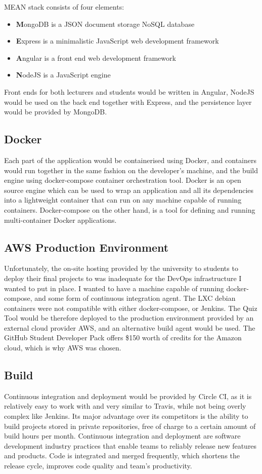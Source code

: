 MEAN stack consists of four elements:
\begin{itemize}
  \item \textbf{M}ongoDB is a JSON document storage NoSQL database
  \item \textbf{E}xpress is a minimalistic JavaScript web development framework
  \item \textbf{A}ngular is a front end web development framework
  \item \textbf{N}odeJS is a JavaScript engine
\end{itemize}

Front ends for both lecturers and students would be written in Angular, NodeJS would be
used on the back end together with Express, and the persistence layer would be provided
by MongoDB.

\subsection{Docker}
Each part of the application would be containerised using Docker\cite{19}, and containers
would run together in the same fashion on the developer's machine, and the build engine
using docker-compose\cite{20} container orchestration tool. Docker is an open source
engine which can be used to wrap an application and all its dependencies into a
lightweight container that can run on any machine capable of running containers\cite{21}.
Docker-compose on the other hand, is a tool for defining and running multi-container
Docker applications.

\subsection{AWS Production Environment}
Unfortunately, the on-site hosting provided by the university to students to deploy
their final projects to was inadequate for the DevOps infrastructure I wanted to
put in place. I wanted to have a machine capable of running docker-compose, and some
form of continuous integration agent. The LXC debian containers\cite{22} were not
compatible with either docker-compose, or Jenkins\cite{23}. The Quiz Tool would be therefore
deployed to the production environment provided by an external cloud provider AWS\cite{24},
and an alternative build agent would be used. The GitHub Student Developer Pack\cite{25} offers
\$150 worth of credits for the Amazon cloud, which is why AWS was chosen.

\subsection{Build}
Continuous integration and deployment would be provided by Circle CI\cite{26}, as it is relatively easy
to work with and very similar to Travis\cite{27}, while not being overly complex like Jenkins\cite{23}.
Its major advantage over its competitors is the ability to build projects stored in private
repositories, free of charge to a certain amount of build hours per month. Continuous integration
and deployment are software development industry practices that enable teams to reliably release
new features and products. Code is integrated and merged frequently, which shortens the release cycle,
improves code quality and team's productivity\cite{28}.

